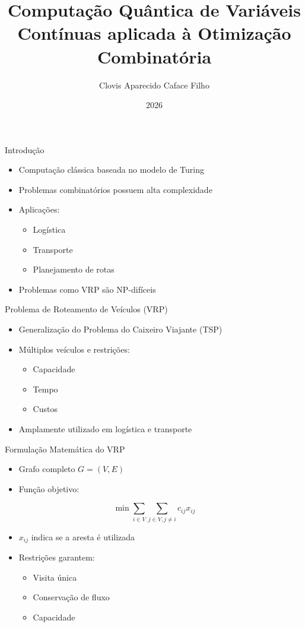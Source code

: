 \documentclass{beamer}
\title{Computação Quântica de Variáveis Contínuas aplicada à Otimização Combinatória}
\author{Clovis Aparecido Caface Filho}
\institute{UFABC}
\date{2026}
\begin{document}
\frame{\titlepage}


\begin{frame}{Introdução}
\begin{itemize}
    \item Computação clássica baseada no modelo de Turing
    \item Problemas combinatórios possuem alta complexidade
    \item Aplicações:
    \begin{itemize}
        \item Logística
        \item Transporte
        \item Planejamento de rotas
    \end{itemize}
    \item Problemas como VRP são NP-difíceis
\end{itemize}
\end{frame}


\begin{frame}{Problema de Roteamento de Veículos (VRP)}
\begin{itemize}
    \item Generalização do Problema do Caixeiro Viajante (TSP)
    \item Múltiplos veículos e restrições:
    \begin{itemize}
        \item Capacidade
        \item Tempo
        \item Custos
    \end{itemize}
    \item Amplamente utilizado em logística e transporte
\end{itemize}
\end{frame}


\begin{frame}{Formulação Matemática do VRP}
\begin{itemize}
    \item Grafo completo $G=(V,E)$
    \item Função objetivo:
\end{itemize}

$$
\min \sum_{i \in V} \sum_{j \in V, j \neq i} c_{ij} x_{ij}
$$

\begin{itemize}
    \item $x_{ij}$ indica se a aresta é utilizada
    \item Restrições garantem:
    \begin{itemize}
        \item Visita única
        \item Conservação de fluxo
        \item Capacidade
    \end{itemize}
\end{itemize}
\end{frame}
\end{document}
